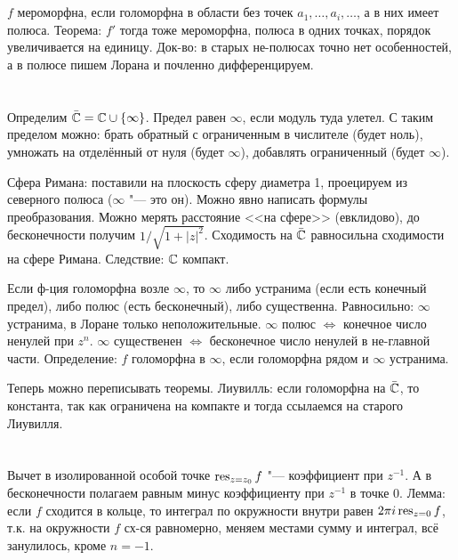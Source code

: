 \section{} %
	$f$ мероморфна, если голоморфна в области без точек $a_1, \dots, a_i, \dots$,
	а в них имеет полюса.
	Теорема: $f'$ тогда тоже мероморфна, полюса в одних точках, порядок увеличивается на единицу.
	Док-во: в старых не-полюсах точно нет особенностей, а в полюсе пишем Лорана и почленно дифференцируем.

\section{} %
	Определим $\bar {\mathbb{C}} = \mathbb{C} \cup \{ \infty \}$.
	Предел равен $\infty$, если модуль туда улетел.
	С таким пределом можно:
	брать обратный с ограниченным в числителе (будет ноль),
	умножать на отделённый от нуля (будет $\infty$),
	добавлять ограниченный (будет $\infty$).
	
	Сфера Римана: поставили на плоскость сферу диаметра 1,
	проецируем из северного полюса ($\infty$ "--- это он).
	Можно явно написать формулы преобразования.
	Можно мерять расстояние <<на сфере>> (евклидово), до бесконечности получим $1/\sqrt{1+|z|^2}$.
	Сходимость на $\bar {\mathbb{C}}$ равносильна сходимости на сфере Римана.
	Следствие: $\mathbb{C}$ компакт.

	Если ф-ция голоморфна возле $\infty$, то $\infty$ либо устранима (если есть конечный предел),
	либо полюс (есть бесконечный), либо существенна.
	Равносильно: $\infty$ устранима, в Лоране только неположительные.
	$\infty$ полюс $\iff$ конечное число ненулей при $z^n$.
	$\infty$ существенен $\iff$ бесконечное число ненулей в не-главной части.
	Определение: $f$ голоморфна в $\infty$, если голоморфна рядом и $\infty$ устранима.

	Теперь можно переписывать теоремы.
	Лиувилль: если голоморфна на $\bar {\mathbb{C}}$, то константа,
	так как ограничена на компакте и тогда ссылаемся на старого Лиувилля.

\section{} %
	Вычет в изолированной особой точке $\operatorname*{res}_{z=z_0} f$ "--- коэффициент при $z^{-1}$.
	А в бесконечности полагаем равным минус коэффициенту при $z^{-1}$ в точке 0.
	Лемма: если $f$ сходится в кольце, то интеграл по окружности внутри равен $2 \pi i \operatorname*{res}_{z=0} f$,
	т.к. на окружности $f$ сх-ся равномерно, меняем местами сумму и интеграл,
	всё занулилось, кроме $n=-1$.

